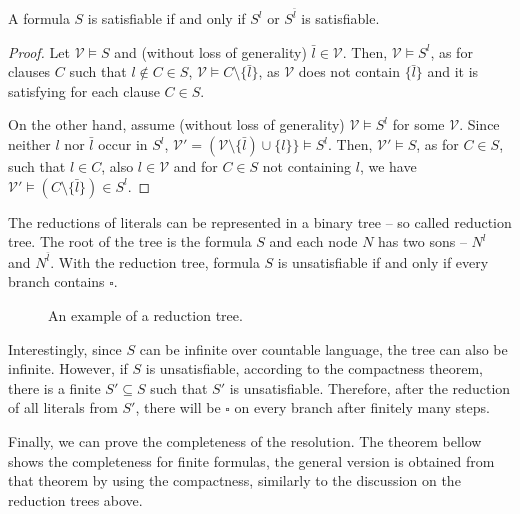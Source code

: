 \begin{lemma}
A formula $S$ is satisfiable if and only if $S^l$ or $S^{\bar{l}}$ is satisfiable.
\end{lemma}
\begin{proof}
Let $\mathcal{V} \vDash S$ and (without loss of generality) $\bar{l} \in \mathcal{V}$. Then, $\mathcal{V} \vDash S^l$, as for clauses $C$ such that $l \notin C \in S$, $\mathcal{V} \vDash C \setminus \{\bar{l}\}$, as $\mathcal{V}$ does not contain $\{\bar{l}\}$ and it is satisfying for each clause $C \in S$.

On the other hand, assume (without loss of generality) $\mathcal{V} \vDash S^l$ for some $\mathcal{V}$. Since neither $l$ nor $\bar{l}$ occur in $S^l$, $\mathcal{V}' = (\mathcal{V} \setminus \{\bar{l}) \cup \{l\}\} \vDash S^l$. Then, $\mathcal{V}' \vDash S$, as for $C \in S$, such that $l \in C$, also $l \in \mathcal{V}$ and for $C \in S$ not containing $l$, we have $\mathcal{V}' \vDash (C \setminus \{\bar{l}\}) \in S^l$.
\end{proof}

The reductions of literals can be represented in a binary tree -- so called reduction tree. The root of the tree is the formula $S$ and each node $N$ has two sons -- $N^l$ and $N^{\bar{l}}$. With the reduction tree, formula $S$ is unsatisfiable if and only if every branch contains $\square$.

\begin{figure}
\centering
{}
\caption{An example of a reduction tree.}
\end{figure}

Interestingly, since $S$ can be infinite over countable language, the tree can also be infinite. However, if $S$ is unsatisfiable, according to the compactness theorem, there is a finite $S' \subseteq S$ such that $S'$ is unsatisfiable. Therefore, after the reduction of all literals from $S'$, there will be $\square$ on every branch after finitely many steps.

Finally, we can prove the completeness of the resolution. The theorem bellow shows the completeness for finite formulas, the general version is obtained from that theorem by using the compactness, similarly to the discussion on the reduction trees above.

